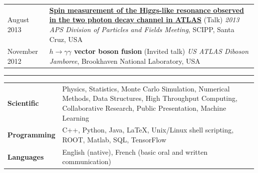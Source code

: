 \documentclass{letter}
\begin{document}
\begin{tabular}{p{}p{}}
\\
	August 2013
	&
	\href{https://indico.bnl.gov/contributionDisplay.py?contribId=155&sessionId=9&confId=603}{\textbf{Spin measurement of the Higgs-like resonance observed in the two photon decay channel in ATLAS}} (Talk) \newline
	\textit{2013 APS Division of Particles and Fields Meeting}, SCIPP, Santa Cruz, USA \newline
\\
	November 2012
	&
	\textbf{$h\rightarrow \gamma \gamma$ vector boson fusion} (Invited talk) \newline
	\textit{US ATLAS Diboson Jamboree}, Brookhaven National Laboratory, USA \newline
\end{tabular}
\vspace{-10pt}


\begin{flushleft}
\Large{\textsc{\textbf{\color{Maroon}{Skills}}}}
\vspace{1pt} %
\hrule
\end{flushleft}

\begin{tabular}{p{}p{}}
	{\bf Scientific} 
	&
	Physics, Statistics, Monte Carlo Simulation, Numerical Methods, Data Structures, High Throughput Computing, Collaborative Research, Public Presentation, Machine Learning \newline
\\
	{\bf Programming} 
	&
	C++, Python, Java, \LaTeX{}, Unix/Linux shell scripting, ROOT, Matlab, SQL, TensorFlow \newline
\\ 
	{\bf Languages}
	&
	English (native), French (basic oral and written communication)
\end{tabular}
\end{document}
